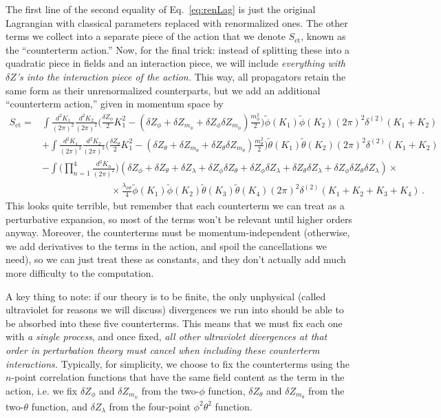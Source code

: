 \documentclass{article}
\newcommand{\td}[1]{\tilde{#1}}
\numberwithin{equation}{subsection}
\begin{document}
The first line of the second equality of Eq.~\eqref{eq:renLag} is just the original Lagrangian with classical parameters replaced with renormalized ones. The other terms we collect into 
a separate piece of the action that we denote $S_{\text{ct}}$, known as the ``counterterm action.'' Now, for the final trick: instead of splitting these into a quadratic piece in fields 
and an interaction piece, we will include \textit{everything with $\delta Z$'s into the interaction piece of the action.} This way, all propagators retain the same form as their unrenormalized 
counterparts, but we add an additional ``counterterm action,'' given in momentum space by
\begin{equation}\begin{split}\label{eq:CTact}
    S_{\text{ct}} =& \int\frac{d^2K_1}{(2\pi)^2}\frac{d^2K_2}{(2\pi)^2}\Bigg(\frac{\delta Z_\phi}{2} K_1^2 
	- (\delta Z_\phi + \delta Z_{m_\phi} + \delta Z_\phi \delta Z_{m_\phi})\frac{m_\phi^2}{2}\Bigg)\td \phi(K_1)\td\phi(K_2)(2\pi)^2\delta^{(2)}(K_1 + K_2) \\[0.5em]
    &+\int\frac{d^2K_1}{(2\pi)^2}\frac{d^2K_2}{(2\pi)^2}\Bigg(\frac{\delta Z_\theta}{2} K_1^2 
	- (\delta Z_\theta + \delta Z_{m_\theta} + \delta Z_\theta \delta Z_{m_\theta})\frac{m_\theta^2}{2}\Bigg)\td\theta(K_1)\td\theta(K_2)(2\pi)^2\delta^{(2)}(K_1 + K_2) \\[0.5em]
    &- \int\Bigg(\prod_{n=1}^4\frac{d^2K_n}{(2\pi)^2}\Bigg)(\delta Z_\phi + \delta Z_\theta + \delta Z_\lambda + \delta Z_\phi \delta Z_\theta 
	+ \delta Z_\phi \delta Z_\lambda + \delta Z_\theta \delta Z_\lambda + \delta Z_\phi \delta Z_\theta\delta Z_\lambda)\times\\[0.5em]
    &\hspace{3cm}\times\frac{\lambda_{\phi\theta}}{4}\td\phi(K_1)\td\phi(K_2)\td\theta(K_3)\td\theta(K_4)(2\pi)^2\delta^{(2)}(K_1 + K_2 + K_3 + K_4)\,.
\end{split}\end{equation}
This looks quite terrible, but remember that each counterterm we can treat as a perturbative expansion, so most of the terms won't be relevant until higher orders anyway. Moreover, 
the counterterms must be momentum-independent (otherwise, we add derivatives to the terms in the action, and spoil the cancellations we need), so we can just treat these as constants, 
and they don't actually add much more difficulty to the computation.

A key thing to note: if our theory is to be finite, the only unphysical (called ultraviolet for reasons we will discuss) divergences we run into should be able to be absorbed into these 
five counterterms. This means that we must fix each one with \textit{a single process}, and once fixed, \textit{all other ultraviolet divergences at that order in 
perturbation theory must cancel when including these counterterm interactions.} 
Typically, for simplicity, we choose to fix the counterterms using the $n$-point correlation functions that have the same field content as the term in 
the action, i.e. we fix $\delta Z_\phi$ and $\delta Z_{m_\phi}$ from the two-$\phi$ function, $\delta Z_\theta$ and $\delta Z_{m_\theta}$ from the two-$\theta$ function, 
and $\delta Z_\lambda$ from the four-point $\phi^2\theta^2$ function.
\end{document}
